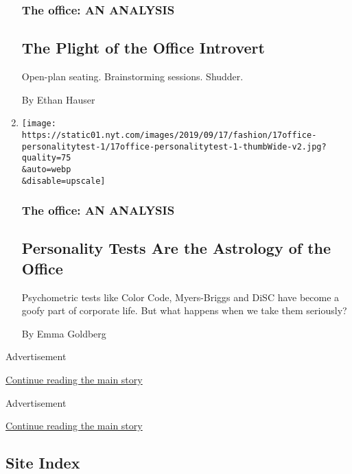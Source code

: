 \begin{enumerate}
  \hypertarget{the-office-an-analysis-6}{%
  \subsubsection{The office: AN
  ANALYSIS}\label{the-office-an-analysis-6}}

  \hypertarget{the-plight-of-the-office-introvert}{%
  \subsection{The Plight of the Office
  Introvert}\label{the-plight-of-the-office-introvert}}

  Open-plan seating. Brainstorming sessions. Shudder.

  By Ethan Hauser
\item
  \href{/2019/09/17/style/personality-tests-office.html}{}

  \texttt{[image: https://static01.nyt.com/images/2019/09/17/fashion/17office-personalitytest-1/17office-personalitytest-1-thumbWide-v2.jpg?quality=75\\\&auto=webp\\\&disable=upscale]}

  \hypertarget{the-office-an-analysis-7}{%
  \subsubsection{The office: AN
  ANALYSIS}\label{the-office-an-analysis-7}}

  \hypertarget{personality-tests-are-the-astrology-of-the-office}{%
  \subsection{Personality Tests Are the Astrology of the
  Office}\label{personality-tests-are-the-astrology-of-the-office}}

  Psychometric tests like Color Code, Myers-Briggs and DiSC have become
  a goofy part of corporate life. But what happens when we take them
  seriously?

  By Emma Goldberg
\end{enumerate}

Advertisement

\protect\hyperlink{after-mid2}{Continue reading the main story}

Advertisement

\protect\hyperlink{after-mktg}{Continue reading the main story}

\hypertarget{site-index}{%
\subsection{Site Index}\label{site-index}}

